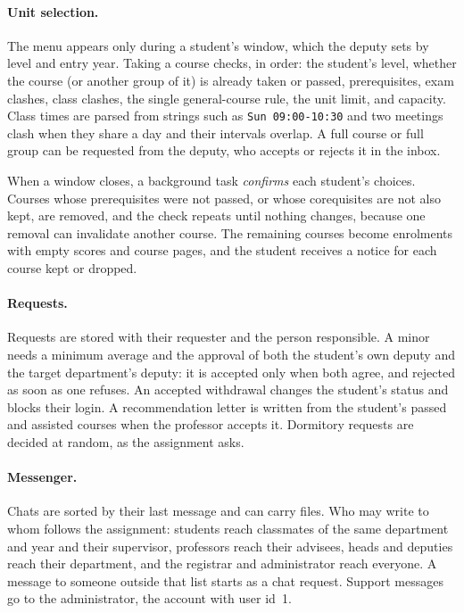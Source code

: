 \documentclass[11pt,a4paper]{article}
\begin{document}
\paragraph{Unit selection.} The menu appears only during a student's window, which the deputy sets by level and entry year. Taking a course checks, in order: the student's level, whether the course (or another group of it) is already taken or passed, prerequisites, exam clashes, class clashes, the single general-course rule, the unit limit, and capacity. Class times are parsed from strings such as \texttt{Sun 09:00-10:30} and two meetings clash when they share a day and their intervals overlap. A full course or full group can be requested from the deputy, who accepts or rejects it in the inbox.

When a window closes, a background task \emph{confirms} each student's choices. Courses whose prerequisites were not passed, or whose corequisites are not also kept, are removed, and the check repeats until nothing changes, because one removal can invalidate another course. The remaining courses become enrolments with empty scores and course pages, and the student receives a notice for each course kept or dropped.

\paragraph{Requests.} Requests are stored with their requester and the person responsible. A minor needs a minimum average and the approval of both the student's own deputy and the target department's deputy: it is accepted only when both agree, and rejected as soon as one refuses. An accepted withdrawal changes the student's status and blocks their login. A recommendation letter is written from the student's passed and assisted courses when the professor accepts it. Dormitory requests are decided at random, as the assignment asks.

\paragraph{Messenger.} Chats are sorted by their last message and can carry files. Who may write to whom follows the assignment: students reach classmates of the same department and year and their supervisor, professors reach their advisees, heads and deputies reach their department, and the registrar and administrator reach everyone. A message to someone outside that list starts as a chat request. Support messages go to the administrator, the account with user id~1.
\end{document}
